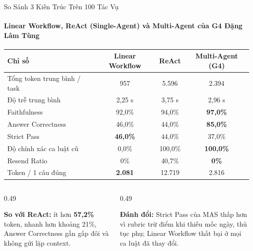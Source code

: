 \documentclass[aspectratio=1610,10pt,xcolor={table}]{beamer}
\begin{document}
\begin{frame}{So Sánh 3 Kiến Trúc Trên 100 Tác Vụ}
  \framesubtitle{Linear Workflow, ReAct (Single-Agent) và Multi-Agent của G4 \hfill Đặng Lâm Tùng}

  \centering\footnotesize
  \begin{tabular}{@{}lccc@{}}
    \toprule
    \textbf{Chỉ số} & \textbf{Linear Workflow} & \textbf{ReAct} & \textbf{Multi-Agent (G4)} \\
    \midrule
    Tổng token trung bình / task & 957 & 5.596 & 2.394 \\
    Độ trễ trung bình & 2,25 s & 3,75 s & 2,96 s \\
    Faithfulness & 92,0\% & 94,0\% & \textbf{97,0\%} \\
    Answer Correctness & 46,0\% & 44,0\% & \textbf{85,0\%} \\
    Strict Pass & \textbf{46,0\%} & 44,0\% & 37,0\% \\
    Độ chính xác ca luật cũ & 0,0\% & 100,0\% & \textbf{100,0\%} \\
    Resend Ratio & 0\% & 40,7\% & \textbf{0\%} \\
    Token / 1 câu đúng & \textbf{2.081} & 12.719 & 2.816 \\
    \bottomrule
  \end{tabular}

  \vspace{0.3cm}
  \begin{columns}[t]
    \begin{column}{0.49\textwidth}
      \begin{tcolorbox}[colback=green!4,colframe=darkgreen,boxrule=0.5pt,arc=1mm]
        \footnotesize\textbf{So với ReAct:} ít hơn \textbf{57,2\%} token, nhanh hơn khoảng 21\%, Answer Correctness gần gấp đôi và không gửi lặp context.
      \end{tcolorbox}
    \end{column}
    \begin{column}{0.49\textwidth}
      \begin{tcolorbox}[colback=orange!5,colframe=alertorange,boxrule=0.5pt,arc=1mm]
        \footnotesize\textbf{Đánh đổi:} Strict Pass của MAS thấp hơn vì rubric trừ điểm khi thiếu mốc ngày, thủ tục phụ; Linear Workflow thất bại ở mọi ca luật đã thay đổi.
      \end{tcolorbox}
    \end{column}
  \end{columns}
\end{frame}
\end{document}
